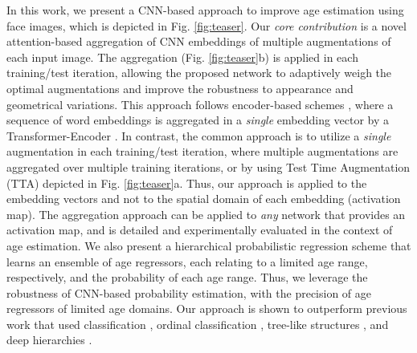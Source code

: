 \documentclass[10pt,journal]{IEEEtran}\usepackage{amsfonts}
\begin{document}
In this work, we present a CNN-based approach to improve age estimation using
face images, which is depicted in Fig. \ref{fig:teaser}. Our \textit{core
contribution} is a novel attention-based aggregation of CNN embeddings of
multiple augmentations of each input image. The aggregation (Fig.
\ref{fig:teaser}b) is applied in each training/test iteration, allowing the
proposed network to adaptively weigh the optimal augmentations and improve the
robustness to appearance and geometrical variations. This approach follows
encoder-based schemes \cite{bert}, where a sequence of word embeddings is
aggregated in a \textit{single} embedding vector by a Transformer-Encoder
\cite{AttentionIsAllYouNeed}. In contrast, the common approach is to utilize a
\textit{single} augmentation in each training/test iteration, where multiple
augmentations are aggregated over multiple training iterations, or by using
Test Time Augmentation (TTA) \cite{TTA-NIPS} depicted in Fig. \ref{fig:teaser}a. Thus, our approach is applied to the embedding vectors and not to the
spatial domain of each embedding (activation map). The aggregation approach
can be applied to \textit{any} network that provides an activation map, and is
detailed and experimentally evaluated in the context of age estimation. We
also present a hierarchical probabilistic regression scheme that learns an
ensemble of age regressors, each relating to a limited age range,
respectively, and the probability of each age range. Thus, we leverage the
robustness of CNN-based probability estimation, with the precision of age
regressors of limited age domains. Our approach is shown to outperform
previous work that used classification \cite{eidinger2014age,leviage}, ordinal
classification \cite{8099569, 7780901, 9145576, coral}, tree-like structures
\cite{8954134}, and deep hierarchies \cite{8954134}.
\end{document}
